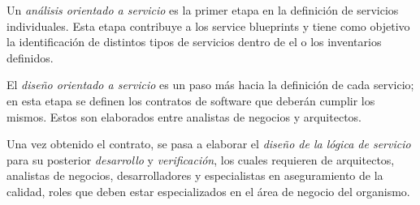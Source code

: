 \documentclass[11pt]{article}
\begin{document}
			Un \emph{análisis orientado a servicio} es la primer etapa en la definición de servicios individuales. Esta etapa contribuye a los service blueprints y tiene como objetivo la identificación de distintos tipos de servicios dentro de el o los inventarios definidos.

			El \emph{diseño orientado a servicio} es un paso más hacia la definición de cada servicio; en esta etapa se definen los contratos de software que deberán cumplir los mismos. Estos son elaborados entre analistas de negocios y arquitectos.

			Una vez obtenido el contrato, se pasa a elaborar el \emph{diseño de la lógica de servicio} para su posterior \emph{desarrollo} y \emph{verificación}, los cuales requieren de arquitectos, analistas de negocios, desarrolladores y especialistas en aseguramiento de la calidad, roles que deben estar especializados en el área de negocio del organismo.


	
	
\end{document}
